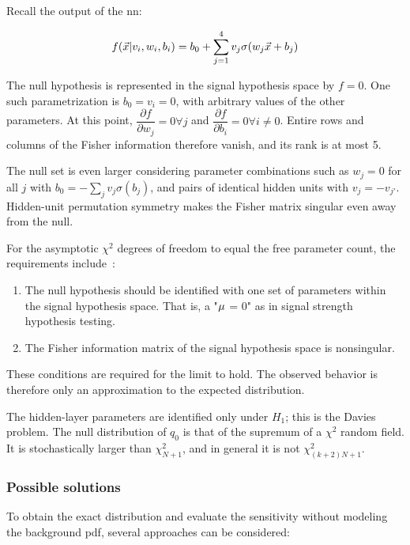 \documentclass[paper/ddppaper2.tex]{subfiles}
\begin{document}
Recall the output of the \gls{nn}:

\begin{equation}
    f(\vec{{x}} | v_i, w_i, b_i) = b_0 + \sum\limits_{j=1}^4 v_j \sigma(w_j \vec{{x}} + b_j)
\end{equation}

The null hypothesis is represented in the signal hypothesis space by $f = 0$. One such parametrization is $b_0 = v_i = 0$, with arbitrary values of the other parameters. At this point, $\dfrac{\partial f}{\partial w_j} = 0 \forall j$ and $\dfrac{\partial f}{\partial b_i} = 0 \forall i \neq 0$. Entire rows and columns of the Fisher information therefore vanish, and its rank is at most 5.

The null set is even larger considering parameter combinations such as $w_j=0$ for all $j$ with $b_0=-\sum_jv_j\sigma(b_j)$, and pairs of identical hidden units with $v_j=-v_{j'}$. Hidden-unit permutation symmetry makes the Fisher matrix singular even away from the null.

For the asymptotic $\chi^2$ degrees of freedom to equal the free parameter count, the requirements include~\cite{Wilks_Original, Wald_Original}:
\begin{enumerate}
    \item The null hypothesis should be identified with one set of parameters within the signal hypothesis space. That is, a "${\mu}$ = 0" as in signal strength hypothesis testing.
    \item The Fisher information matrix of the signal hypothesis space is nonsingular.
\end{enumerate}

These conditions are required for the limit to hold. The observed behavior is therefore only an approximation to the expected distribution.

The hidden-layer parameters are identified only under $H_1$; this is the Davies problem. The null distribution of $q_0$ is that of the supremum of a $\chi^2$ random field. It is stochastically larger than $\chi^2_{N+1}$, and in general it is not $\chi^2_{(k+2)N+1}$.

\subsubsection{Possible solutions}
To obtain the exact distribution and evaluate the sensitivity without modeling the background \gls{pdf}, several approaches can be considered:
\end{document}
